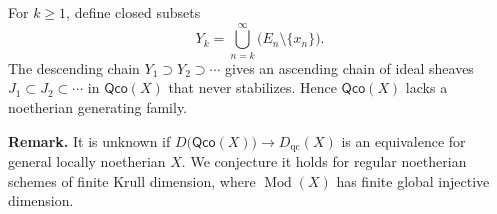 For $k\ge 1$, define closed subsets
\[
Y_k = \bigcup_{n=k}^\infty \big(E_n\setminus\{x_n\}\big).
\]
The descending chain $Y_1\supset Y_2\supset\cdots$ gives an ascending chain of ideal sheaves $J_1\subset J_2\subset\cdots$ in $\mathsf{Qco}(X)$ that never stabilizes. Hence $\mathsf{Qco}(X)$ lacks a noetherian generating family.

\setcounter{page}{136}
\textbf{Remark.}
It is unknown if $D\big(\mathsf{Qco}(X)\big)\to D_{\mathrm{qc}}(X)$ is an equivalence for general locally noetherian $X$. We conjecture it holds for regular noetherian schemes of finite Krull dimension, where $\operatorname{Mod}(X)$ has finite global injective dimension.